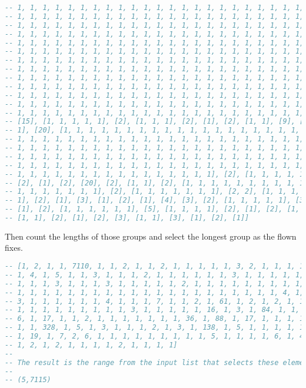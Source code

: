 \documentclass[gap.tex]{subfiles}
\begin{document}
\begin{lstlisting}[language=Haskell, caption={Lists of runs.}]
-- 1, 1, 1, 1, 1, 1, 1, 1, 1, 1, 1, 1, 1, 1, 1, 1, 1, 1, 1, 1, 1, 1, 1, 1, 1,
-- 1, 1, 1, 1, 1, 1, 1, 1, 1, 1, 1, 1, 1, 1, 1, 1, 1, 1, 1, 1, 1, 1, 1, 1, 1,
-- 1, 1, 1, 1, 1, 1, 1, 1, 1, 1, 1, 1, 1, 1, 1, 1, 1, 1, 1, 1, 1, 1, 1, 1, 1,
-- 1, 1, 1, 1, 1, 1, 1, 1, 1, 1, 1, 1, 1, 1, 1, 1, 1, 1, 1, 1, 1, 1, 1, 1, 1,
-- 1, 1, 1, 1, 1, 1, 1, 1, 1, 1, 1, 1, 1, 1, 1, 1, 1, 1, 1, 1, 1, 1, 1, 1, 1,
-- 1, 1, 1, 1, 1, 1, 1, 1, 1, 1, 1, 1, 1, 1, 1, 1, 1, 1, 1, 1, 1, 1, 1, 1, 1,
-- 1, 1, 1, 1, 1, 1, 1, 1, 1, 1, 1, 1, 1, 1, 1, 1, 1, 1, 1, 1, 1, 1, 1, 1, 1,
-- 1, 1, 1, 1, 1, 1, 1, 1, 1, 1, 1, 1, 1, 1, 1, 1, 1, 1, 1, 1, 1, 1, 1, 1, 1,
-- 1, 1, 1, 1, 1, 1, 1, 1, 1, 1, 1, 1, 1, 1, 1, 1, 1, 1, 1, 1, 1, 1, 1, 1, 1,
-- 1, 1, 1, 1, 1, 1, 1, 1, 1, 1, 1, 1, 1, 1, 1, 1, 1, 1, 1, 1, 1, 1, 1, 1, 1,
-- 1, 1, 1, 1, 1, 1, 1, 1, 1, 1, 1, 1, 1, 1, 1, 1, 1, 1, 1, 1, 1, 1, 1, 1, 1,
-- 1, 1, 1, 1, 1, 1, 1, 1, 1, 1, 1, 1, 1, 1, 1, 1, 1, 1, 1, 1, 1, 1, 1, 1, 1,
-- 1, 1, 1, 1, 1, 1, 1, 1, 1, 1, 1, 1, 1, 1, 1, 1, 1, 1, 1, 1, 1, 1, 1, 1],
-- [15], [1, 1, 1, 1, 1], [2], [1, 1, 1], [2], [1], [2], [1, 1], [9], [1, 1,
-- 1], [20], [1, 1, 1, 1, 1, 1, 1, 1, 1, 1, 1, 1, 1, 1, 1, 1, 1, 1, 1, 1, 1, 1,
-- 1, 1, 1, 1, 1, 1, 1, 1, 1, 1, 1, 1, 1, 1, 1, 1, 1, 1, 1, 1, 1, 1, 1, 1, 1,
-- 1, 1, 1, 1, 1, 1, 1, 1, 1, 1, 1, 1, 1, 1, 1, 1, 1, 1, 1, 1, 1, 1, 1, 1, 1,
-- 1, 1, 1, 1, 1, 1, 1, 1, 1, 1, 1, 1, 1, 1, 1, 1, 1, 1, 1, 1, 1, 1, 1, 1, 1,
-- 1, 1, 1, 1, 1, 1, 1, 1, 1, 1, 1, 1, 1, 1, 1, 1, 1, 1, 1, 1, 1, 1, 1, 1, 1,
-- 1, 1, 1, 1, 1, 1, 1, 1, 1, 1, 1, 1, 1, 1, 1, 1], [2], [1, 1, 1, 1, 1], [5],
-- [2], [1], [2], [20], [2], [1, 1], [2], [1, 1, 1, 1, 1, 1, 1, 1, 1, 1, 1, 1,
-- 1, 1, 1, 1, 1, 1, 1], [2], [1, 1, 1, 1, 1, 1, 1], [2, 2], [1, 1, 1, 1, 1,
-- 1], [2], [1], [3], [1], [2], [1], [4], [3], [2], [1, 1, 1, 1, 1], [3], [2],
-- [1], [2], [1, 1, 1, 1, 1, 1], [5], [1, 1, 1, 1], [2], [1], [2], [1, 1], [5],
-- [1, 1], [2], [1], [2], [3], [1, 1], [3], [1], [2], [1]]
\end{lstlisting}

Then count the lengths of those groups and select the longest group as the
flown fixes.

\begin{lstlisting}[language=Haskell, caption={Count the lengths of lists of runs of the same length.}]
-- [1, 2, 1, 1, 7110, 1, 1, 2, 1, 1, 2, 1, 1, 1, 1, 1, 3, 2, 1, 1, 1, 1, 1, 1,
-- 1, 4, 1, 5, 1, 1, 3, 1, 1, 1, 2, 1, 1, 1, 1, 1, 1, 3, 1, 1, 1, 1, 1, 1, 1,
-- 1, 1, 1, 3, 1, 1, 1, 3, 1, 1, 1, 1, 1, 2, 1, 1, 1, 1, 1, 1, 1, 1, 1, 1, 1,
-- 1, 1, 1, 1, 1, 1, 1, 1, 1, 1, 1, 1, 1, 1, 1, 1, 1, 1, 1, 1, 1, 4, 1, 1, 1,
-- 3, 1, 1, 1, 1, 1, 1, 4, 1, 1, 1, 7, 1, 1, 2, 1, 61, 1, 2, 1, 2, 1, 1, 1, 1,
-- 1, 1, 1, 1, 1, 1, 1, 1, 1, 3, 1, 1, 1, 1, 1, 16, 1, 3, 1, 84, 1, 1, 1, 1, 1,
-- 6, 1, 17, 1, 1, 2, 1, 1, 1, 1, 1, 1, 1, 36, 1, 88, 1, 17, 1, 1, 1, 1, 1, 1,
-- 1, 1, 328, 1, 5, 1, 3, 1, 1, 1, 2, 1, 3, 1, 138, 1, 5, 1, 1, 1, 1, 1, 1, 2,
-- 1, 19, 1, 7, 2, 6, 1, 1, 1, 1, 1, 1, 1, 1, 1, 5, 1, 1, 1, 1, 6, 1, 4, 1, 1,
-- 1, 2, 1, 2, 1, 1, 1, 1, 2, 1, 1, 1, 1]
--
-- The result is the range from the input list that selects these elements.
-- 
-- (5,7115)
\end{lstlisting}
\end{document}

